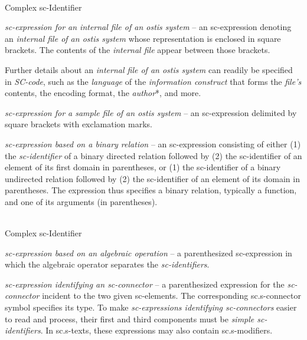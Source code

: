 \begin{frame}{\\Complex sc-Identifier}
	\topline
	\justifying
	\vspace*{\fill}\\
	\scriptsize
		\begin{textitemize}
			\item \textit{sc-expression for an internal file of an ostis system} -- an sc-expression denoting an \textit{internal file of an ostis system} whose representation is enclosed in square brackets. The contents of the \textit{internal file} appear between those brackets.

			Further details about an \textit{internal file of an ostis system} can readily be specified in \textit{SC-code}, such as the \textit{language} of the \textit{information construct} that forms the \textit{file's} contents, the encoding format, the \textit{author}*, and more.

			\item \textit{sc-expression for a sample file of an ostis system} -- an sc-expression delimited by square brackets with exclamation marks.

			\item \textit{sc-expression based on a binary relation} -- an sc-expression consisting of either (1) the \textit{sc-identifier} of a binary directed relation followed by (2) the sc-identifier of an element of its first domain in parentheses, or (1) the sc-identifier of a binary undirected relation followed by (2) the sc-identifier of an element of its domain in parentheses. The expression thus specifies a binary relation, typically a function, and one of its arguments (in parentheses).
		\end{textitemize}
\end{frame}

\begin{frame}{\\Complex sc-Identifier}
	\topline
	\justifying
	\vspace*{\fill}\\
	\scriptsize{
		\begin{textitemize}
			\item{\textit{sc-expression based on an algebraic operation} -- a parenthesized sc-expression in which the algebraic operator separates the \textit{sc-identifiers}.}
			\item{\textit{sc-expression identifying an sc-connector} -- a parenthesized expression for the \textit{sc-connector} incident to the two given sc-elements. The corresponding sc.s-connector symbol specifies its type.
				To make \textit{sc-expressions identifying sc-connectors} easier to read and process, their first and third components must be \textit{simple sc-identifiers}. In sc.s-texts, these expressions may also contain sc.s-modifiers.}
		\end{textitemize}
	}
\end{frame}
